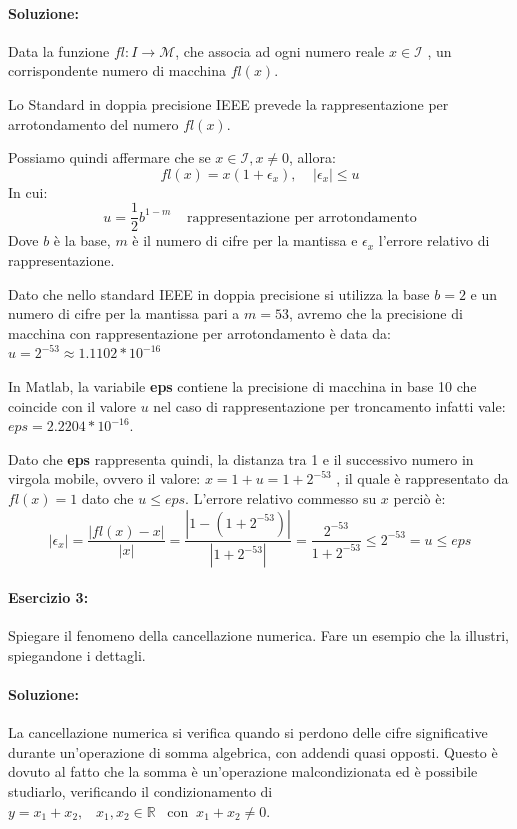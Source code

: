 \documentclass[12pt]{article}
\begin{document}
\paragraph{Soluzione:}
Data la funzione \(fl: I \longrightarrow \mathcal{M}\), che associa ad ogni numero reale \(x \in \mathcal{I}\)
, un corrispondente numero di macchina \(fl(x)\). 

Lo Standard in doppia precisione IEEE prevede la rappresentazione per arrotondamento del numero \(fl(x)\).

Possiamo quindi affermare che se \(x \in \mathcal{I}, x\neq 0\), allora:
$$ fl(x)=x(1+\epsilon_x), \;\;\;\; |\epsilon_x|\leq u$$
In cui:
$$ u = \frac{1}{2}b^{1-m}\;\;\;\; \text{rappresentazione per arrotondamento}$$   
Dove \(b\) è la base, \(m\) è il numero di cifre per la mantissa e \(\epsilon_x\) l'errore relativo di rappresentazione.

Dato che nello standard IEEE in doppia precisione si utilizza la base \(b=2\) e un numero di cifre per la mantissa pari a \(m=53\), avremo che la 
precisione di macchina con rappresentazione per arrotondamento è data da: \(u=2^{-53}\approx 1.1102* 10^{-16}\)

In Matlab, la variabile \textbf{eps} contiene la precisione di macchina in base 10 che coincide con il valore \(u\) nel caso di rappresentazione per troncamento
infatti vale: \(eps=2.2204*10^{-16}\). 

Dato che \textbf{eps} rappresenta quindi, la distanza tra 1 e il successivo numero in virgola mobile, ovvero il valore: \(x=1+u=1+2^{-53}\)
, il quale è rappresentato da \(fl(x)=1\) dato che \(u\leq eps\). 
L'errore relativo commesso su \(x\) perciò è:
$$ |\epsilon_x| =\frac{|fl(x)-x|}{|x|}=\frac{|1-(1+2^{-53})|}{|1+2^{-53}|}=\frac{2^{-53}}{1+2^{-53}} \le 2^{-53}=u \le eps$$

\paragraph{Esercizio 3:} Spiegare il fenomeno della cancellazione numerica. Fare un esempio che la illustri, spiegandone i dettagli.

\paragraph{Soluzione:}
La cancellazione numerica si verifica quando si perdono delle cifre significative durante un'operazione di somma algebrica, con addendi quasi opposti.
Questo è dovuto al fatto che la somma è un'operazione malcondizionata ed è possibile studiarlo, verificando il condizionamento di \(y=x_1+x_2,\;\;\; x_1,x_2 \in \mathbb{R} \;\;\;\text{con}\;\; x_1+x_2\neq 0\).
\end{document}
